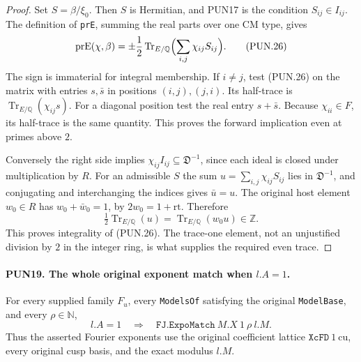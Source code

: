 \begin{proof}
Set \(S=\beta/\xi_0\).  Then \(S\) is Hermitian, and PUN17
is the condition \(S_{ij}\in I_{ij}\).  The definition of
\texttt{prE}, summing the real parts over one CM type, gives
\[
 \operatorname{prE}(\chi,\beta)
       =\pm\frac12\operatorname{Tr}_{E/\mathbb Q}
                              \Bigl(\sum_{i,j}\chi_{ij}S_{ij}\Bigr).
 \tag{PUN.26}
\]
The sign is immaterial for integral membership.  If \(i\ne j\),
test (PUN.26) on the matrix with entries \(s,\bar s\) in
positions \((i,j),(j,i)\).  Its half-trace is
\(\operatorname{Tr}_{E/\mathbb Q}(\chi_{ij}s)\).
For a diagonal position test the real entry \(s+\bar s\).
Because \(\chi_{ii}\in F\), its half-trace is the same
quantity.  This proves the forward implication even at primes
above \(2\).

Conversely the right side implies
\(\chi_{ij}I_{ij}\subseteq\mathfrak D^{-1}\), since
each ideal is closed under multiplication by \(R\).
For an admissible \(S\) the sum
\(u=\sum_{i,j}\chi_{ij}S_{ij}\) lies in
\(\mathfrak D^{-1}\), and conjugating and interchanging the
indices gives \(\bar u=u\).  The original host element
\(w_0\in R\) has \(w_0+\bar w_0=1\), by
\(2w_0=1+\mathrm{rt}\).  Therefore
\[
 \tfrac12\operatorname{Tr}_{E/\mathbb Q}(u)
       =\operatorname{Tr}_{E/\mathbb Q}(w_0u)\in\mathbb Z.
 \tag{PUN.27}
\]
This proves integrality of (PUN.26).  The trace-one element,
not an unjustified division by \(2\) in the integer ring,
is what supplies the required even trace.
\end{proof}

\paragraph{PUN19. The whole original exponent match when \(l.A=1\).}
\label{claim:PUN19}
For every supplied family \(F_u\), every \texttt{ModelsOf}
satisfying the original \texttt{ModelBase}, and every
\(\rho\in\mathbb N\),
\[
                  l.A=1\quad\Longrightarrow\quad
                         \texttt{FJ.ExpoMatch}\ M.X\ 1\ \rho\ l.M.
 \tag{PUN.28}
\]
Thus the asserted Fourier exponents use the original coefficient
lattice \(\texttt{XcFD}\ 1\ \mathrm{cu}\), every original
cusp basis, and the exact modulus \(l.M\).

